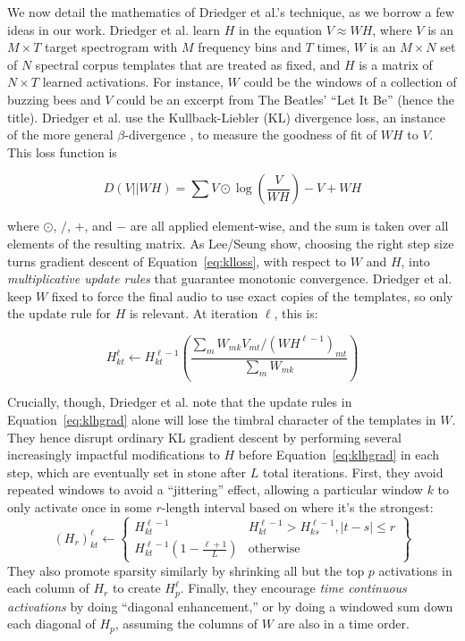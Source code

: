 \documentclass{article}
\begin{document}
We now detail the mathematics of Driedger et al.'s technique, as we borrow a few ideas in our work.  Driedger et al. learn $H$ in the equation $V \approx WH$, where $V$ is an $M \times T$ target spectrogram with $M$ frequency bins and $T$ times, $W$ is an $M \times N$ set of $N$ spectral corpus templates that are treated as fixed, and $H$ is a matrix of $N \times T$ learned activations.  For instance, $W$ could be the windows of a collection of buzzing bees and $V$ could be an excerpt from The Beatles' ``Let It Be'' (hence the title).  Driedger et al. use the Kullback-Liebler (KL) divergence loss, an instance of the more general $\beta$-divergence \cite{buch2017nichtnegativematrixfaktorisierungnutzendesklangsynthesensystem}, to measure the goodness of fit of $WH$ to $V$.  This loss function is 

\begin{equation}
\label{eq:klloss}
D(V || WH) = \sum V \odot \log \left( \frac{V}{WH} \right) - V + WH
\end{equation}

where $\odot$, $/$, $+$, and $-$ are all applied element-wise, and the sum is taken over all elements of the resulting matrix.  As Lee/Seung show, choosing the right step size turns gradient descent of Equation~\ref{eq:klloss}, with respect to $W$ and $H$, into {\em multiplicative update rules} that guarantee monotonic convergence.  Driedger et al. keep $W$ fixed to force the final audio to use exact copies of the templates, so only the update rule for $H$ is relevant.  At iteration $\ell$, this is:

\begin{equation}
\label{eq:klhgrad}
H_{kt}^{\ell} \gets H_{kt}^{\ell-1} \left( \frac{ \sum_{m} W_{mk} V_{mt} / (WH^{\ell-1})_{mt} }{ \sum_{m} W_{mk} } \right)
\end{equation}

Crucially, though, Driedger et al. note that the update rules in Equation~\ref{eq:klhgrad} alone will lose the timbral character of the templates in $W$.  They hence disrupt ordinary KL gradient descent by performing several increasingly impactful modifications to $H$ before Equation~\ref{eq:klhgrad} in each step, which are eventually set in stone after $L$ total iterations.  First, they avoid repeated windows to avoid a ``jittering'' effect, allowing a particular window $k$ to only activate once in some $r$-length interval based on where it's the strongest:
\begin{equation}
    \label{eq:driedgerrepeated}
    (H_r)_{kt}^{\ell} \gets \left\{ \begin{array}{cc} H^{\ell-1}_{kt} & H^{\ell-1}_{kt} > H^{\ell-1}_{ks}, |t - s| \leq r \\ H^{\ell-1}_{kt} (1 - \frac{\ell+1}{L}) & \text{otherwise}  \end{array} \right\}
\end{equation}
They also promote sparsity similarly by shrinking all but the top $p$ activations in each column of $H_r$ to create $H_p^{\ell}$.  Finally, they encourage {\em time continuous activations} by doing ``diagonal enhancement,'' or by doing a windowed sum down each diagonal of $H_p$, assuming the columns of $W$ are also in a time order.
\end{document}
